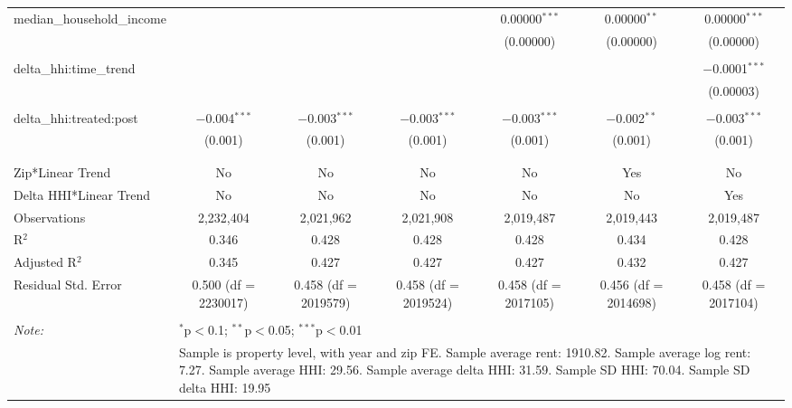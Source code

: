 \begin{table}[H]
{\begin{tabular}{@{\extracolsep{5pt}}lcccccc}
  median\_household\_income &  &  &  & 0.00000$^{***}$ & 0.00000$^{**}$ & 0.00000$^{***}$ \\  

   &  &  &  & (0.00000) & (0.00000) & (0.00000) \\  

   & & & & & & \\  

  delta\_hhi:time\_trend &  &  &  &  &  & $-$0.0001$^{***}$ \\  

   &  &  &  &  &  & (0.00003) \\  

   & & & & & & \\  

  delta\_hhi:treated:post & $-$0.004$^{***}$ & $-$0.003$^{***}$ & $-$0.003$^{***}$ & $-$0.003$^{***}$ & $-$0.002$^{**}$ & $-$0.003$^{***}$ \\  

   & (0.001) & (0.001) & (0.001) & (0.001) & (0.001) & (0.001) \\  

   & & & & & & \\  

 \hline \\[-1.8ex]  

 Zip*Linear Trend & No & No & No & No & Yes & No \\  

 Delta HHI*Linear Trend & No & No & No & No & No & Yes \\  

 Observations & 2,232,404 & 2,021,962 & 2,021,908 & 2,019,487 & 2,019,443 & 2,019,487 \\  

 R$^{2}$ & 0.346 & 0.428 & 0.428 & 0.428 & 0.434 & 0.428 \\  

 Adjusted R$^{2}$ & 0.345 & 0.427 & 0.427 & 0.427 & 0.432 & 0.427 \\  

 Residual Std. Error & 0.500 (df = 2230017) & 0.458 (df = 2019579) & 0.458 (df = 2019524) & 0.458 (df = 2017105) & 0.456 (df = 2014698) & 0.458 (df = 2017104) \\  

 \hline  

 \hline \\[-1.8ex]  

 \textit{Note:}  & \multicolumn{6}{l}{$^{*}$p$<$0.1; $^{**}$p$<$0.05; $^{***}$p$<$0.01} \\  

  & \multicolumn{6}{l}{Sample is property level, with year and zip FE. Sample average rent: 1910.82. Sample average log rent: 7.27. Sample average HHI: 29.56. Sample average delta HHI: 31.59. Sample SD HHI: 70.04. Sample SD delta HHI: 19.95} \\  

 \end{tabular}}  

 \end{table}  

